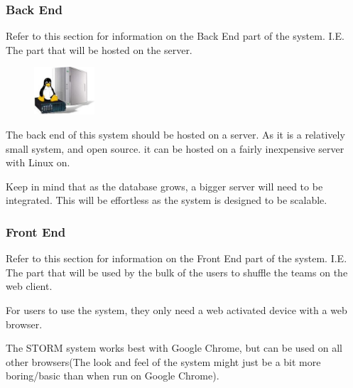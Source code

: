 \subsubsection{Back End}
	Refer to this section for information on the Back End part of the system. I.E. The part that will be hosted on the server.\par
	\vspace{0.3cm}
	
\begin{figure}
    \includegraphics[width=0.2\textwidth]{./graphics/LinuxServer.jpg}
\end{figure}

The back end of this system should be hosted on a server.
As it is a relatively small system, and open source. it can be hosted on a fairly inexpensive server with Linux on.

Keep in mind that as the database grows, a bigger server will need to be integrated.  This will be effortless as the system is designed to be scalable.


\subsubsection{Front End}
	Refer to this section for information on the Front End part of the system. I.E. The part that will be 	used by the bulk of the users to shuffle the teams on the web client.\par
	\vspace{0.3cm}
	
For users to use the system, they only need a web activated device with a web browser.

The STORM system works best with Google Chrome, but can be used on all other browsers(The look and feel of the system might just be a bit more boring/basic than when run on Google Chrome).

